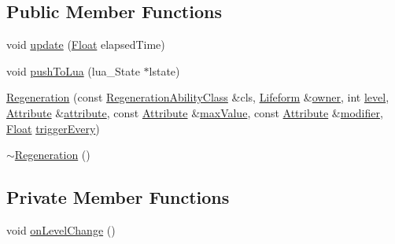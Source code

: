 \subsection*{Public Member Functions}
\begin{DoxyCompactItemize}
\item 
void \hyperlink{classZeta_1_1Regeneration_ac5b8c20a390119872a5d25d158382a3e}{update} (\hyperlink{namespaceZeta_a1e0a1265f9b3bd3075fb0fabd39088ba}{Float} elapsed\+Time)
\item 
void \hyperlink{classZeta_1_1Regeneration_a74a20dc10ddeb7f515881f386320f85f}{push\+To\+Lua} (lua\+\_\+\+State $\ast$lstate)
\item 
\hyperlink{classZeta_1_1Regeneration_ad1b002c316cd73638fde0b8da6631afb}{Regeneration} (const \hyperlink{classZeta_1_1RegenerationAbilityClass}{Regeneration\+Ability\+Class} \&cls, \hyperlink{classZeta_1_1Lifeform}{Lifeform} \&\hyperlink{classZeta_1_1Ability_ad37bed67f04178297d6fe4c9a2ed619a}{owner}, int \hyperlink{classZeta_1_1Ability_a41d29a6fb79dd19a7eed5f6a4be5de9a}{level}, \hyperlink{classZeta_1_1Attribute}{Attribute} \&\hyperlink{classZeta_1_1Regeneration_a4fa438adb70cb98b169aa2931378d48c}{attribute}, const \hyperlink{classZeta_1_1Attribute}{Attribute} \&\hyperlink{classZeta_1_1Regeneration_ad671097a7b0231886a723123b6edd4d3}{max\+Value}, const \hyperlink{classZeta_1_1Attribute}{Attribute} \&\hyperlink{classZeta_1_1Regeneration_aab9346cb0b0f4d353d51192d7c019a0d}{modifier}, \hyperlink{namespaceZeta_a1e0a1265f9b3bd3075fb0fabd39088ba}{Float} \hyperlink{classZeta_1_1Regeneration_a6aad295d1fb310f9bd575baaa8d124a3}{trigger\+Every})
\item 
\hyperlink{classZeta_1_1Regeneration_a3ae37ce13183ba2ae93e8ca2cff3db6a}{$\sim$\+Regeneration} ()
\end{DoxyCompactItemize}
\subsection*{Private Member Functions}
\begin{DoxyCompactItemize}
\item 
void \hyperlink{classZeta_1_1Regeneration_a937aac46f00754b7d1e4e757b8c4a252}{on\+Level\+Change} ()
\end{DoxyCompactItemize}

